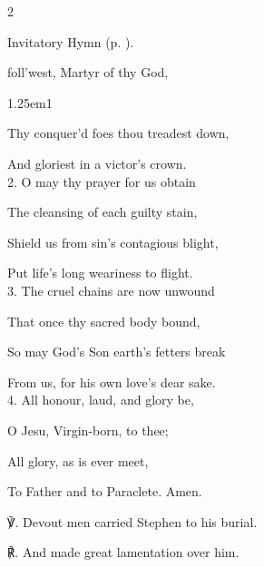 

\begin{paracol}{2}
\sloppy

\mattins

\begin{rubric}
	Invitatory Hymn  (p. \pageref{MartyrEvensong}).
\end{rubric}


\mattinsOfficeHymn\label{StephenMattins}

 foll'west, Martyr of thy God,


\begin{hangparas}{1.25em}{1}

Thy conquer'd foes thou treadest down,

And gloriest in a victor's crown.\\

2. O may thy prayer for us obtain

The cleansing of each guilty stain,

Shield us from sin's contagious blight,

Put life's long weariness to flight.\\

3. The cruel chains are now unwound

That once thy sacred body bound,

So may God's Son earth's fetters break

From us, for his own love's dear sake.\\

4. All honour, laud, and glory be,

O Jesu, Virgin-born, to thee;

All glory, as is ever meet,

To Father and to Paraclete. Amen.\\
\end{hangparas}

℣. Devout men carried Stephen to his burial.

℟. And made great lamentation over him.


\end{paracol}
